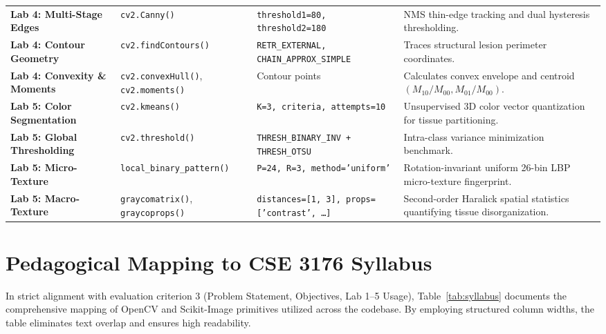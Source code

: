 \documentclass[conference]{IEEEtran}
\begin{document}
\begin{table}[t]
\begin{tabularx}{\textwidth}{@{}L{2.8cm} L{3.5cm} L{4.5cm} Y@{}}
\textbf{Lab 4: Multi-Stage Edges} & \texttt{cv2.Canny()} & \texttt{threshold1=80, threshold2=180} & NMS thin-edge tracking and dual hysteresis thresholding. \\
\textbf{Lab 4: Contour Geometry} & \texttt{cv2.findContours()} & \texttt{RETR\_EXTERNAL, CHAIN\_APPROX\_SIMPLE} & Traces structural lesion perimeter coordinates. \\
\textbf{Lab 4: Convexity \& Moments} & \texttt{cv2.convexHull()}, \texttt{cv2.moments()} & Contour points & Calculates convex envelope and centroid $(M_{10}/M_{00}, M_{01}/M_{00})$. \\
\textbf{Lab 5: Color Segmentation} & \texttt{cv2.kmeans()} & \texttt{K=3, criteria, attempts=10} & Unsupervised 3D color vector quantization for tissue partitioning. \\
\textbf{Lab 5: Global Thresholding} & \texttt{cv2.threshold()} & \texttt{THRESH\_BINARY\_INV + THRESH\_OTSU} & Intra-class variance minimization benchmark. \\
\textbf{Lab 5: Micro-Texture} & \texttt{local\_binary\_pattern()} & \texttt{P=24, R=3, method='uniform'} & Rotation-invariant uniform 26-bin LBP micro-texture fingerprint. \\
\textbf{Lab 5: Macro-Texture} & \texttt{graycomatrix()}, \texttt{graycoprops()} & \texttt{distances=[1, 3], props=['contrast', \dots]} & Second-order Haralick spatial statistics quantifying tissue disorganization. \\
\bottomrule
\end{tabularx}
\end{table}

\section{Pedagogical Mapping to CSE 3176 Syllabus}
In strict alignment with evaluation criterion 3 (Problem Statement, Objectives, Lab 1--5 Usage), Table~\ref{tab:syllabus} documents the comprehensive mapping of OpenCV and Scikit-Image primitives utilized across the codebase. By employing structured column widths, the table eliminates text overlap and ensures high readability.

\end{document}
